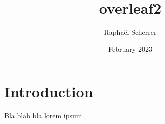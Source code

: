 \documentclass{article}
\title{overleaf2}
\author{Raphaël Scherrer}
\date{February 2023}
\begin{document}
\maketitle

\section{Introduction}

Bla blab  bla lorem ipsum
\end{document}
